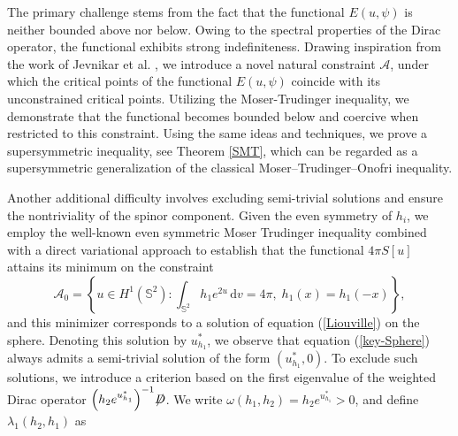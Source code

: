 \documentclass[a4paper, 12pt]{article}
\def\slashiii#1{\setbox0=\hbox{$#1$}#1\hskip-\wd0\hbox to\wd0{\hss\sl/\/\hss}}
\begin{document}
The primary challenge stems from the fact that the functional \(E(u,\psi) \) is neither bounded above nor below. Owing to the spectral properties of the Dirac operator, the functional exhibits strong indefiniteness. Drawing inspiration from the work of Jevnikar et al. \cite{jevnikar2020existence1,MR4206467}, we introduce a novel natural constraint \( \mathcal{A} \), under which the critical points of the functional \(E(u,\psi) \) coincide with its unconstrained critical points. Utilizing the Moser-Trudinger inequality, we demonstrate that the functional becomes bounded below and coercive when restricted to this constraint. Using the same ideas and techniques, we prove a supersymmetric inequality, see Theorem \ref{SMT}, which can be regarded as a supersymmetric generalization of the classical Moser–Trudinger–Onofri inequality.

Another additional difficulty involves excluding semi-trivial solutions and ensure the nontriviality of the spinor component. Given the even symmetry of  \(h_i\), we employ the well-known even symmetric Moser Trudinger inequality combined with a direct variational approach to establish that the functional \(4\pi S[u]\) attains its minimum on the constraint
\[
\mathcal{A}_0 = \left\{ u \in H^1(\mathbb{S}^2) : \int_{\mathbb{S}^2} h_1 e^{2u} \, \text{d}v = 4\pi, \; h_1(x) = h_1(-x) \right\},
\]
and this minimizer corresponds to a solution of equation (\ref{Liouville}) on the sphere. Denoting  this solution by \(u_{h_1}^*\), we observe that equation (\ref{key-Sphere}) always admits a semi-trivial solution of the form \((u_{h_1}^*,0)\). To exclude such solutions, we introduce a criterion based on the first eigenvalue of the weighted Dirac operator ${\left( {{h_2}{e^{{u_{h_1}^*}}}} \right)^{ - 1}}\slashiii{D}$. We write $\omega \left( {{h_1},{h_2}} \right) = {h_2}{e^{u_{{h_1}}^*}}>0$, and define $\lambda _1({h_2},{h_1})$ as
\end{document}

